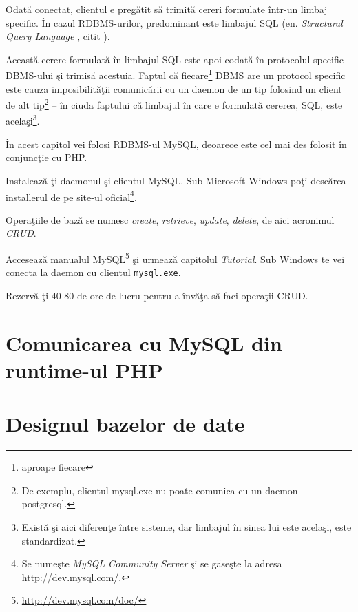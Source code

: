 Odată conectat, clientul e pregătit să trimită cereri formulate
într-un limbaj specific. În cazul RDBMS-urilor, predominant este
limbajul SQL (en. \textsl{Structural Query Language}
, citit \texttt{}).%

Această cerere formulată în limbajul SQL este apoi codată în
protocolul specific DBMS-ului şi trimisă acestuia.
Faptul că fiecare\footnote{aproape fiecare} DBMS are un protocol
specific este cauza imposibilităţii comunicării cu un daemon
de un tip folosind un client de alt tip\footnote{De exemplu,
clientul mysql.exe nu poate comunica cu un daemon postgresql.}
-- în ciuda faptului că limbajul în care e formulată cererea, SQL,
este acelaşi\footnote{Există şi aici diferenţe între sisteme,
dar limbajul în sinea lui este acelaşi, este standardizat.}.

În acest capitol vei folosi RDBMS-ul MySQL, deoarece este
cel mai des folosit în conjuncţie cu PHP.

\begin{Exercise}[title={Primii paşi în baze de date}]
\ExePart

Instalează-ţi daemonul şi clientul MySQL. Sub Microsoft
Windows poţi descărca installerul de pe site-ul
oficial\footnote{Se numeşte \textit{MySQL Community Server} şi se găseşte
la adresa \url{http://dev.mysql.com/}.}.

\ExePart

Operaţiile de bază se numesc \textit{create}, \textit{retrieve},
\textit{update}, \textit{delete}, de aici acronimul \textsl{CRUD}.

Accesează manualul MySQL\footnote{\url{http://dev.mysql.com/doc/}}
şi urmează capitolul \textit{Tutorial}. Sub Windows te vei conecta la daemon
cu clientul \texttt{mysql.exe}.

Rezervă-ţi 40-80 de ore de lucru pentru a învăţa să faci operaţii CRUD.
\end{Exercise}

\section{Comunicarea cu MySQL din runtime-ul PHP}

\section{Designul bazelor de date}

